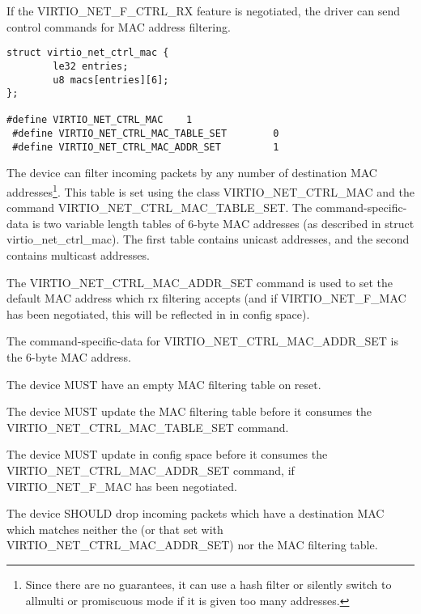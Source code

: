 If the VIRTIO_NET_F_CTRL_RX feature is negotiated, the driver can
send control commands for MAC address filtering.

\begin{lstlisting}
struct virtio_net_ctrl_mac {
        le32 entries;
        u8 macs[entries][6];
};

#define VIRTIO_NET_CTRL_MAC    1
 #define VIRTIO_NET_CTRL_MAC_TABLE_SET        0
 #define VIRTIO_NET_CTRL_MAC_ADDR_SET         1
\end{lstlisting}

The device can filter incoming packets by any number of destination
MAC addresses\footnote{Since there are no guarantees, it can use a hash filter or
silently switch to allmulti or promiscuous mode if it is given too
many addresses.
}. This table is set using the class
VIRTIO_NET_CTRL_MAC and the command VIRTIO_NET_CTRL_MAC_TABLE_SET. The
command-specific-data is two variable length tables of 6-byte MAC
addresses (as described in struct virtio_net_ctrl_mac). The first table contains unicast addresses, and the second
contains multicast addresses.

The VIRTIO_NET_CTRL_MAC_ADDR_SET command is used to set the
default MAC address which rx filtering
accepts (and if VIRTIO_NET_F_MAC has been negotiated,
this will be reflected in  in config space).

The command-specific-data for VIRTIO_NET_CTRL_MAC_ADDR_SET is
the 6-byte MAC address.


The device MUST have an empty MAC filtering table on reset.

The device MUST update the MAC filtering table before it consumes
the VIRTIO_NET_CTRL_MAC_TABLE_SET command.

The device MUST update  in config space before it consumes
the VIRTIO_NET_CTRL_MAC_ADDR_SET command, if VIRTIO_NET_F_MAC has
been negotiated.

The device SHOULD drop incoming packets which have a destination MAC which
matches neither the  (or that set with VIRTIO_NET_CTRL_MAC_ADDR_SET)
nor the MAC filtering table.


